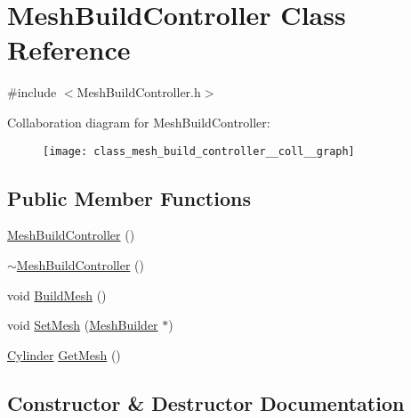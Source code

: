 \hypertarget{class_mesh_build_controller}{}\section{Mesh\+Build\+Controller Class Reference}
\label{class_mesh_build_controller}


{\ttfamily \#include $<$Mesh\+Build\+Controller.\+h$>$}



Collaboration diagram for Mesh\+Build\+Controller\+:\nopagebreak
\begin{figure}[H]
\begin{center}
\leavevmode
\texttt{[image: class\_mesh\_build\_controller\_\_coll\_\_graph]}
\end{center}
\end{figure}
\subsection*{Public Member Functions}
\begin{DoxyCompactItemize}
\item 
\mbox{\hyperlink{class_mesh_build_controller_ac8ef0ce983b5809c737db46f6dc68b78}{Mesh\+Build\+Controller}} ()
\item 
\mbox{\hyperlink{class_mesh_build_controller_ac560bebe076bc5b1faee1b130f94c502}{$\sim$\+Mesh\+Build\+Controller}} ()
\item 
void \mbox{\hyperlink{class_mesh_build_controller_a5e9b10ae8668baf9abe53d8ba8233f67}{Build\+Mesh}} ()
\item 
void \mbox{\hyperlink{class_mesh_build_controller_aa08c7701786d5123c3fff36dcc1887b7}{Set\+Mesh}} (\mbox{\hyperlink{class_mesh_builder}{Mesh\+Builder}} $\ast$)
\item 
\mbox{\hyperlink{class_cylinder}{Cylinder}} \mbox{\hyperlink{class_mesh_build_controller_af2cef7d3c8a83ca7c206487fc5eb682e}{Get\+Mesh}} ()
\end{DoxyCompactItemize}


\subsection{Constructor \& Destructor Documentation}
\mbox{\label{class_mesh_build_controller_ac8ef0ce983b5809c737db46f6dc68b78}} 
